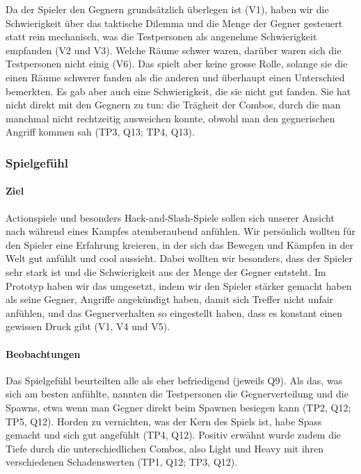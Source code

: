 \documentclass[../Main.tex]{subfiles}
\begin{document}
Da der Spieler den Gegnern grundsätzlich überlegen ist (V1), haben wir die Schwierigkeit über das taktische Dilemma und die Menge der Gegner gesteuert statt rein mechanisch, was die Testpersonen als angenehme Schwierigkeit empfanden (V2 und V3). Welche Räume schwer waren, darüber waren sich die Testpersonen nicht einig (V6). Das spielt aber keine grosse Rolle, solange sie die einen Räume schwerer fanden als die anderen und überhaupt einen Unterschied bemerkten. Es gab aber auch eine Schwierigkeit, die sie nicht gut fanden. Sie hat nicht direkt mit den Gegnern zu tun: die Trägheit der Combos, durch die man manchmal nicht rechtzeitig ausweichen konnte, obwohl man den gegnerischen Angriff kommen sah (TP3, Q13; TP4, Q13).

\subsubsection{Spielgefühl}

\paragraph{Ziel}
Actionspiele und besonders Hack-and-Slash-Spiele sollen sich unserer Ansicht nach während eines Kampfes atemberaubend anfühlen. Wir persönlich wollten für den Spieler eine Erfahrung kreieren, in der sich das Bewegen und Kämpfen in der Welt gut anfühlt und cool aussieht. Dabei wollten wir besonders, dass der Spieler sehr stark ist und die Schwierigkeit aus der Menge der Gegner entsteht. Im Prototyp haben wir das umgesetzt, indem wir den Spieler stärker gemacht haben als seine Gegner, Angriffe angekündigt haben, damit sich Treffer nicht unfair anfühlen, und das Gegnerverhalten so eingestellt haben, dass es konstant einen gewissen Druck gibt (V1, V4 und V5).

\paragraph{Beobachtungen}
Das Spielgefühl beurteilten alle als eher befriedigend (jeweils Q9). Als das, was sich am besten anfühlte, nannten die Testpersonen die Gegnerverteilung und die Spawns, etwa wenn man Gegner direkt beim Spawnen besiegen kann (TP2, Q12; TP5, Q12). Horden zu vernichten, was der Kern des Spiels ist, habe Spass gemacht und sich gut angefühlt (TP4, Q12). Positiv erwähnt wurde zudem die Tiefe durch die unterschiedlichen Combos, also Light und Heavy mit ihren verschiedenen Schadenswerten (TP1, Q12; TP3, Q12).
\end{document}
